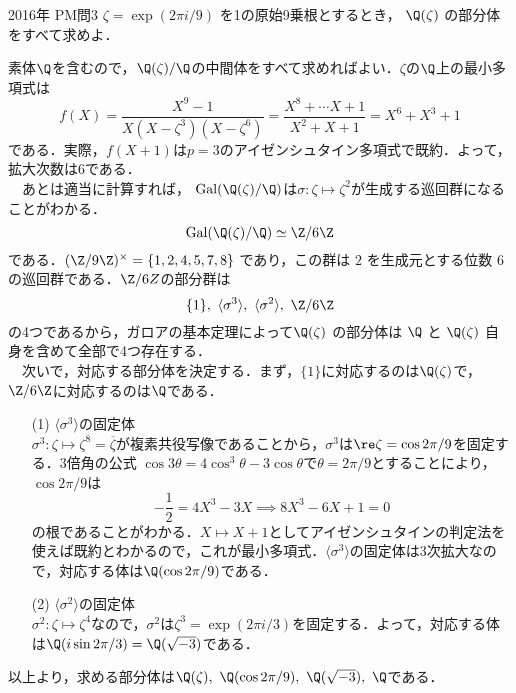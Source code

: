 \documentclass[a4paper,11pt]{ltjsarticle}
\title{}
\author{}
\date{}
\begin{document}
\thispagestyle{empty}
\begin{ascolorbox17}{2016年 PM問3}
$\zeta = \exp(2\pi i/9)$ を1の原始9乗根とするとき， $\Q(\zeta)$ の部分体をすべて求めよ．
\end{ascolorbox17}
\ans
素体$\Q$を含むので，$\Q(\zeta)/\Q$の中間体をすべて求めればよい．$\zeta$の$\Q$上の最小多項式は
\[f(X)=\frac{X^9-1}{X(X-\zeta^3)(X-\zeta^6)}=\frac{X^8+\cdots X+1}{X^2+X+1}=X^6+X^3+1\]
である．実際，$f(X+1)$は$p=3$のアイゼンシュタイン多項式で既約．よって，拡大次数は6である．\\
　あとは適当に計算すれば， $\mathrm{Gal}(\Q(\zeta)/\Q)$は$\sigma:\zeta\mapsto \zeta^2$が生成する巡回群になることがわかる．
\[ \mathrm{Gal}(\Q(\zeta)/\Q) \simeq \Z/6\Z \]
である．$(\Z/9\Z)^\times = \{1, 2, 4, 5, 7, 8\}$ であり，この群は $2$ を生成元とする位数 $6$ の巡回群である．$\Z/6Z$の部分群は
\[\{1\},~\langle\sigma^3\rangle,~\langle \sigma^2\rangle,~\Z/6\Z\]
の4つであるから，ガロアの基本定理によって$\Q(\zeta)$ の部分体は $\Q$ と $\Q(\zeta)$ 自身を含めて全部で4つ存在する．\\
　次いで，対応する部分体を決定する．まず，$\{1\}$に対応するのは$\Q(\zeta)$で，$\Z/6\Z$に対応するのは$\Q$である．
\begin{itemize}
\item[(1)]$\langle\sigma^3\rangle$の固定体\\
$\sigma^3:\zeta\mapsto \zeta^8=\overline{\zeta}$が複素共役写像であることから，$\sigma^3$は$\re\zeta=\cos2\pi/9$を固定する．3倍角の公式 $\cos3\theta = 4\cos^3\theta - 3\cos\theta$で$\theta=2\pi/9$とすることにより，$\cos2\pi/9$は
\[ -\frac{1}{2} = 4X^3 - 3X \implies 8X^3 - 6X + 1 = 0 \]
の根であることがわかる．$X\mapsto X+1$としてアイゼンシュタインの判定法を使えば既約とわかるので，これが最小多項式．$\langle\sigma^3\rangle$の固定体は3次拡大なので，対応する体は$\Q(\cos 2\pi/9)$である．
\item[(2)]$\langle \sigma^2\rangle$の固定体\\
$\sigma^2:\zeta\mapsto \zeta^4$なので，$\sigma^2$は$\zeta^3=\exp(2\pi i/3)$を固定する．よって，対応する体は$\Q(i\sin 2\pi/3)=\Q(\sqrt{-3})$である．
\end{itemize}
以上より，求める部分体は$\Q(\zeta),~\Q(\cos 2\pi/9),~\Q(\sqrt{-3}),~\Q$である．
\end{document}
